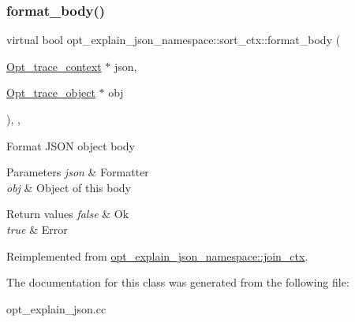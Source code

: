 \subsubsection{\texorpdfstring{format\+\_\+body()}{format\_body()}}
{\footnotesize\ttfamily virtual bool opt\+\_\+explain\+\_\+json\+\_\+namespace\+::sort\+\_\+ctx\+::format\+\_\+body (\begin{DoxyParamCaption}\item[{\mbox{\hyperlink{classOpt__trace__context}{Opt\+\_\+trace\+\_\+context}} $\ast$}]{json,  }\item[{\mbox{\hyperlink{classOpt__trace__object}{Opt\+\_\+trace\+\_\+object}} $\ast$}]{obj }\end{DoxyParamCaption})\hspace{0.3cm}{\ttfamily [inline]}, {\ttfamily [protected]}, {\ttfamily [virtual]}}

Format J\+S\+ON object body


\begin{DoxyParams}{Parameters}
{\em json} & Formatter \\
\hline
{\em obj} & Object of this body\\
\hline
\end{DoxyParams}

\begin{DoxyRetVals}{Return values}
{\em false} & Ok \\
\hline
{\em true} & Error \\
\hline
\end{DoxyRetVals}


Reimplemented from \mbox{\hyperlink{classopt__explain__json__namespace_1_1join__ctx_a5893d00aa1ebaa3c0f6d5cd55898f13c}{opt\+\_\+explain\+\_\+json\+\_\+namespace\+::join\+\_\+ctx}}.



The documentation for this class was generated from the following file\+:\begin{DoxyCompactItemize}
\item 
opt\+\_\+explain\+\_\+json.\+cc\end{DoxyCompactItemize}

